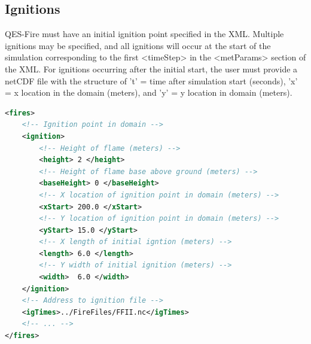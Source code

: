 \subsection{Ignitions}

QES-Fire must have an initial ignition point specified in the XML. Multiple ignitions may be specified, and all ignitions will occur at the start of the simulation corresponding to the first <timeStep> in the <metParams> section of the XML. For ignitions occurring after the initial start, the user must provide a netCDF file with the structure of 't' = time after simulation start (seconds), 'x' = x location in the domain (meters), and 'y' = y location in domain (meters).

\begin{lstlisting}[language=XML]
<fires>
    <!-- Ignition point in domain -->
    <ignition>
        <!-- Height of flame (meters) -->
        <height> 2 </height>
        <!-- Height of flame base above ground (meters) --> 
        <baseHeight> 0 </baseHeight>
        <!-- X location of ignition point in domain (meters) -->
        <xStart> 200.0 </xStart>
        <!-- Y location of ignition point in domain (meters) -->
        <yStart> 15.0 </yStart>
        <!-- X length of initial igntion (meters) -->
        <length> 6.0 </length>
        <!-- Y width of initial ignition (meters) -->
        <width>  6.0 </width>
    </ignition>
    <!-- Address to ignition file -->
    <igTimes>../FireFiles/FFII.nc</igTimes>
    <!-- ... -->
</fires>
\end{lstlisting}

